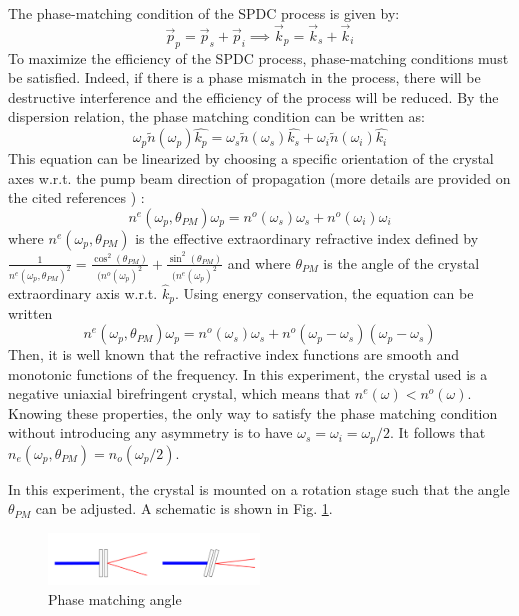 \documentclass[a4paper, 12pt,oneside]{article}
\begin{document}
The phase-matching condition of the SPDC process is given by:
\begin{equation}
    \vec{p}_p = \vec{p}_s + \vec{p}_i \implies \vec{k}_p = \vec{k}_s + \vec{k}_i
\end{equation}
To maximize the efficiency of the SPDC process, phase-matching conditions must be satisfied. Indeed, if there is a phase mismatch in the process, there will be destructive interference and the efficiency of the process will be reduced. 
By the dispersion relation, the phase matching condition can be written as:
\begin{equation}
    \omega_p \tilde{n}(\omega_p) \hat{k_p} = \omega_s \tilde{n}(\omega_s)  \hat{k_s} + \omega_i \tilde{n}(\omega_i)  \hat{k_i}
\end{equation}
This equation can be linearized by choosing a specific orientation of the crystal axes w.r.t. the pump beam direction of propagation (more details are provided on the cited references \cite{Matching-condition} \cite{Matching-condition2}) :
\begin{equation}
    n^e(\omega_p,\theta_{PM})\omega_p = n^o(\omega_s)\omega_s + n^o(\omega_i)\omega_i
\end{equation}
where  $n^e(\omega_p,\theta_{PM})$ is the effective extraordinary refractive index defined by $\frac{1}{n^e(\omega_p,\theta_{PM})^2} = \frac{\cos^2(\theta_{PM})}{(n^o(\omega_p)^2} + \frac{\sin^2(\theta_{PM})}{(n^e(\omega_p)^2}$ and where $\theta_{PM}$ is the angle of the crystal extraordinary axis w.r.t. $\hat{k}_p$.
Using energy conservation, the equation can be written
\begin{equation}
    n^e(\omega_p,\theta_{PM})\omega_p = n^o(\omega_s)\omega_s + n^o(\omega_p - \omega_s)(\omega_p - \omega_s)
\end{equation}
Then, it is well known that the refractive index functions are smooth and monotonic functions of the frequency. In this experiment, the crystal used is a negative uniaxial birefringent crystal, which means that $n^e(\omega) < n^o(\omega)$. Knowing these properties, the only way to satisfy the phase matching condition without introducing any asymmetry is to have $\omega_s = \omega_i = \omega_p/2$. It follows that $n_e(\omega_p,\theta_{PM}) = n_o(\omega_p/2)$.

In this experiment, the crystal is mounted on a rotation stage such that the angle $\theta_{PM}$ can be adjusted. A schematic is shown in Fig. \ref{Phase matching angle}.
\begin{figure}[H]
    \centering
    \includegraphics[width=0.5\textwidth]{Figures/Phase_matching_angle.png}
    \caption{Phase matching angle}
    \label{Phase matching angle}
\end{figure}
\end{document}
